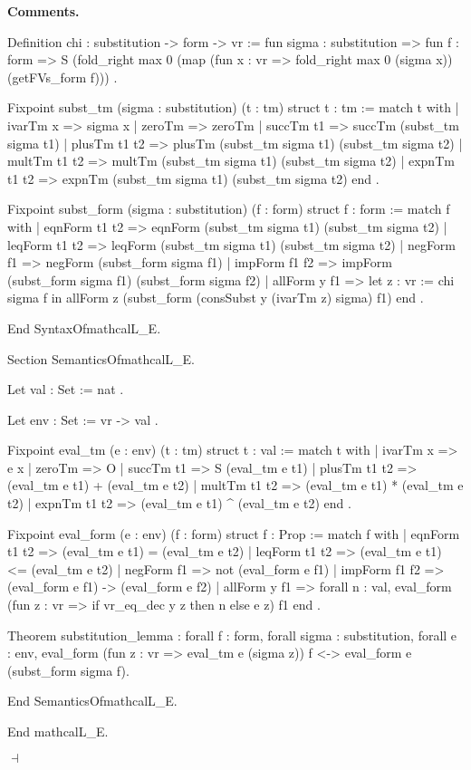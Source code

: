 \documentclass[12pt]{paper}
\newenvironment{context}[1][]
{ \noindent \textbf{{#1}.}
}
{ \hfill $ \dashv $
}
\begin{document}
\begin{context}[Comments]
\begin{enumerate}
\begin{coqcode}
  Definition chi : substitution -> form -> vr :=
    fun sigma : substitution =>
    fun f : form =>
    S (fold_right max 0 (map (fun x : vr => fold_right max 0 (sigma x)) (getFVs_form f)))
  .

  Fixpoint subst_tm (sigma : substitution) (t : tm) {struct t} : tm :=
    match t with
    | ivarTm x => sigma x
    | zeroTm => zeroTm
    | succTm t1 => succTm (subst_tm sigma t1)
    | plusTm t1 t2 => plusTm (subst_tm sigma t1) (subst_tm sigma t2)
    | multTm t1 t2 => multTm (subst_tm sigma t1) (subst_tm sigma t2)
    | expnTm t1 t2 => expnTm (subst_tm sigma t1) (subst_tm sigma t2)
    end
  .

  Fixpoint subst_form (sigma : substitution) (f : form) {struct f} : form :=
    match f with
    | eqnForm t1 t2 => eqnForm (subst_tm sigma t1) (subst_tm sigma t2)
    | leqForm t1 t2 => leqForm (subst_tm sigma t1) (subst_tm sigma t2)
    | negForm f1 => negForm (subst_form sigma f1)
    | impForm f1 f2 => impForm (subst_form sigma f1) (subst_form sigma f2)
    | allForm y f1 =>
      let z : vr := chi sigma f in
      allForm z (subst_form (consSubst y (ivarTm z) sigma) f1)
    end
  .

  End SyntaxOfmathcalL_E.

  Section SemanticsOfmathcalL_E.

  Let val : Set :=
    nat
  .

  Let env : Set :=
    vr -> val
  .

  Fixpoint eval_tm (e : env) (t : tm) {struct t} : val :=
    match t with
    | ivarTm x => e x
    | zeroTm => O
    | succTm t1 => S (eval_tm e t1)
    | plusTm t1 t2 => (eval_tm e t1) + (eval_tm e t2)
    | multTm t1 t2 => (eval_tm e t1) * (eval_tm e t2)
    | expnTm t1 t2 => (eval_tm e t1) ^ (eval_tm e t2)
    end
  .

  Fixpoint eval_form (e : env) (f : form) {struct f} : Prop :=
    match f with
    | eqnForm t1 t2 => (eval_tm e t1) = (eval_tm e t2)
    | leqForm t1 t2 => (eval_tm e t1) <= (eval_tm e t2)
    | negForm f1 => not (eval_form e f1)
    | impForm f1 f2 => (eval_form e f1) -> (eval_form e f2)
    | allForm y f1 =>
      forall n : val,
      eval_form (fun z : vr => if vr_eq_dec y z then n else e z) f1
    end
  .

  Theorem substitution_lemma :
    forall f : form,
    forall sigma : substitution,
    forall e : env,
    eval_form (fun z : vr => eval_tm e (sigma z)) f <-> eval_form e (subst_form sigma f).

  End SemanticsOfmathcalL_E.

End mathcalL_E.
\end{coqcode} 
    \end{enumerate}
  \end{context}
\end{document}
